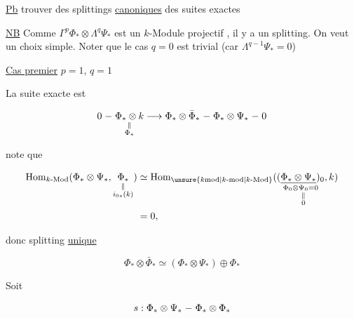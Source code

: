 
\uline{Pb} trouver des splittings \uline{canoniques} des suites exactes


\uline{NB} Comme $\Gamma^p\Phi_*\otimes\Lambda^q\Psi_*$ est un $k$-Module projectif , il y a un splitting. On veut un choix simple. Noter que le cas $q=0$ est trivial (car $\Lambda^{q-1}\Psi_*=0$)

\uline{Cas premier} $p=1$, $q=1$

La suite exacte est

\[
0\relbar\underset{\substack{\Vert\\\Phi_*}}{\Phi_*\otimes k}\longrightarrow\Phi_*\otimes\bar\Phi_*\relbar\Phi_*\otimes\Psi_*\relbar0
\]

 note que

\[
\begin{aligned}
\operatorname{Hom}_{k\text{-Mod}}(\Phi_*\otimes\Psi_*,\underset{\substack{\Vert\\i_{0*}(k)}}{\Phi_*})
 &\simeq\operatorname{Hom}_{\unsure{k\mathrm{mod}|k\text{-mod}|k\text{-Mod}}}(\underset{\Phi_0\otimes\underset{\substack{\Vert\\0}}{\Psi_0}=0}{(\underline{\Phi_*\otimes\Psi_*})_0},k)\\
 &=0,
\end{aligned}
\]

donc splitting \uline{unique}

\[
\Phi_*\otimes\bar\Phi_*\simeq(\Phi_*\otimes\Psi_*)\oplus\Phi_*
\]

Soit 

\[
s:\Phi_*\otimes\Psi_*\relbar\Phi_*\otimes\Phi_*
\]

